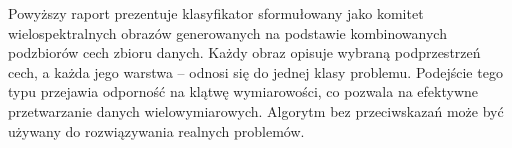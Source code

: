 
Powyższy raport prezentuje klasyfikator sformułowany jako komitet wielospektralnych obrazów generowanych na podstawie kombinowanych podzbiorów cech zbioru danych. Każdy obraz opisuje wybraną podprzestrzeń cech, a każda jego warstwa -- odnosi się do jednej klasy problemu. Podejście tego typu przejawia odporność na klątwę wymiarowości, co pozwala na efektywne przetwarzanie danych wielowymiarowych. Algorytm bez przeciwskazań może być używany do rozwiązywania realnych problemów.
